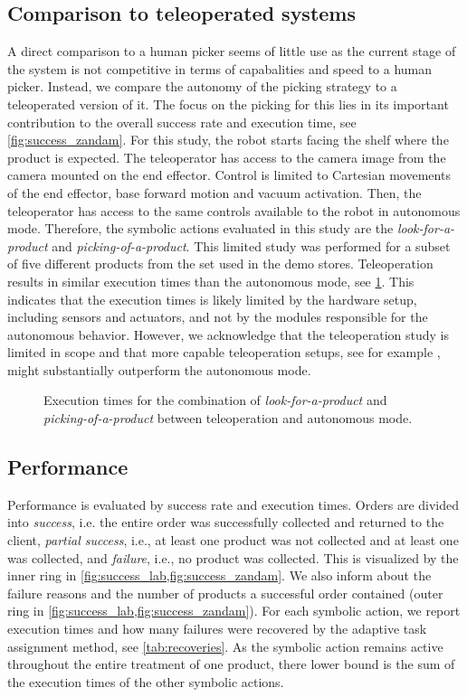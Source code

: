 \subsection{Comparison to teleoperated systems}

A direct comparison to a human picker seems of little use as
the current stage of the system is not competitive in terms
of capabalities and speed to a human picker. Instead, 
 we compare the autonomy of
the picking strategy to a teleoperated version of it.
The
focus on the picking for this lies in its important
contribution to the overall success rate and execution time,
see \cref{fig:success_zandam}. For this study, the robot starts
facing the shelf where the product is expected. The teleoperator
has access to the camera image from the camera mounted on
the end effector. Control is limited to Cartesian movements
of the end effector, base forward motion and vacuum
activation. Then, the teleoperator has access to the same controls
available to the robot in autonomous mode. Therefore, the
symbolic actions evaluated in this study are the
\textit{look-for-a-product} and
\textit{picking-of-a-product}. This limited study was
performed for a subset of five different products from the
set used in the demo stores. Teleoperation results in
similar execution times than the autonomous mode, see
\cref{fig:teleoperation}. This indicates that the 
execution times is likely limited by the hardware setup,
including sensors and actuators, and not by the modules
responsible for the autonomous behavior. However, we acknowledge
that the teleoperation study is limited in scope and that
more capable teleoperation setups, see for example
\cite{behnke202310},
might substantially
outperform the autonomous mode.

\begin{figure}[ht]
  \centering
  
  \caption{Execution times for the combination
  of \textit{look-for-a-product} and
  \textit{picking-of-a-product} between teleoperation and 
  autonomous mode.}
  \label{fig:teleoperation}
\end{figure}
%
\subsection{Performance}
%
Performance is evaluated by success rate and execution
times. Orders are divided into \textit{success}, i.e. the
entire order was successfully collected and returned to the
client, \textit{partial success}, i.e., at least one product
was not collected and at least one was collected, and
\textit{failure}, i.e., no product was collected. This is
visualized by the inner ring in
\cref{fig:success_lab,fig:success_zandam}. We also
inform about the failure reasons and the number
of products a successful order contained (outer ring in
\cref{fig:success_lab,fig:success_zandam}). For each
symbolic action,
we report execution times and how many failures were
recovered by the adaptive task assignment method, see
\cref{tab:recoveries}. As the symbolic action remains active
throughout the entire treatment of one product, there lower
bound is the sum of the execution times of the other
symbolic actions.

